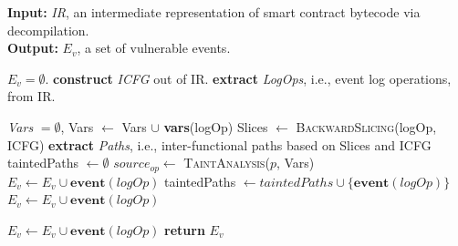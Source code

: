 \begin{algorithm}[t]
\label{algo:bytecode}
  \footnotesize
  \caption{Detecting Inconsistent Logging and Event Counterfeiting via Backward Taint Analysis}
  \textbf{Input:} \textit{IR}, an intermediate representation of smart contract bytecode via decompilation. \\
  \textbf{Output:} $E_v$, a set of vulnerable events. 
  \begin{algorithmic}[1]
    \State  $E_v = \emptyset$. 
    \State \textbf{construct} \textit{ICFG} out of IR.
    \State \textbf{extract} \textit{LogOps}, i.e., event log operations, from IR.  
    
    \State  \textit{Vars} $= \emptyset$, 
      \State Vars $\gets$ Vars $\cup$ \textbf{vars}(logOp)  
      \State Slices $\gets$ \textsc{BackwardSlicing}(logOp, ICFG) 
          \State \textbf{extract} \textit{Paths}, i.e., inter-functional paths based on Slices and ICFG
      \State taintedPaths $\gets \emptyset$   
        \State $source_{op} \gets$ \textsc{TaintAnalysis}($p$, Vars) 
                \State $E_v \gets E_v \cup \textbf{event}(logOp)$ 
            \EndIf
            \State taintedPaths $\gets taintedPaths \cup \{\textbf{event}(logOp)\} $   
        \Else
                 \State $E_v \gets E_v \cup \textbf{event}(logOp)$ 
            \EndIf

        \EndIf
        
      \EndFor
               \State $E_v \gets E_v \cup \textbf{event}(logOp)$ 
        \EndIf
    \EndFor
    \State \textbf{return} $E_v$


\end{algorithmic}
\end{algorithm}
